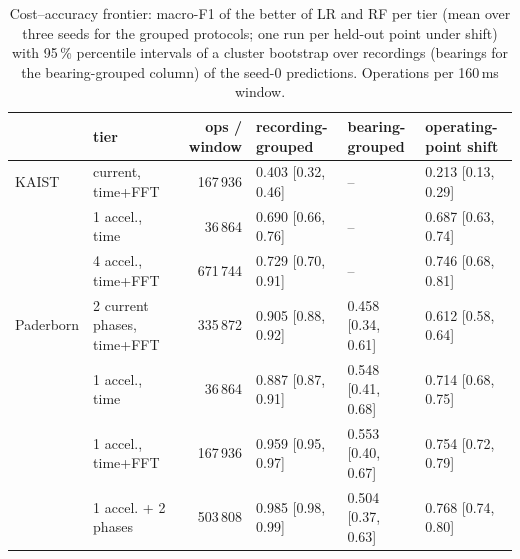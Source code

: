 \begin{table}[tb]\centering\footnotesize
\caption{Cost--accuracy frontier: macro-F1 of the better of LR and RF per tier (mean over three seeds for the grouped protocols; one run per held-out point under shift) with 95\,\% percentile intervals of a cluster bootstrap over recordings (bearings for the bearing-grouped column) of the seed-0 predictions. Operations per 160\,ms window.}
\label{tab:frontier}
\setlength{\tabcolsep}{3.5pt}\begin{tabular}{llrlll}\hline
 & tier & ops / window & recording-grouped & bearing-grouped & operating-point shift \\ \hline
KAIST & current, time+FFT & 167\,936 & 0.403 [0.32, 0.46] & -- & 0.213 [0.13, 0.29] \\
 & 1 accel., time & 36\,864 & 0.690 [0.66, 0.76] & -- & 0.687 [0.63, 0.74] \\
 & 4 accel., time+FFT & 671\,744 & 0.729 [0.70, 0.91] & -- & 0.746 [0.68, 0.81] \\
Paderborn & 2 current phases, time+FFT & 335\,872 & 0.905 [0.88, 0.92] & 0.458 [0.34, 0.61] & 0.612 [0.58, 0.64] \\
 & 1 accel., time & 36\,864 & 0.887 [0.87, 0.91] & 0.548 [0.41, 0.68] & 0.714 [0.68, 0.75] \\
 & 1 accel., time+FFT & 167\,936 & 0.959 [0.95, 0.97] & 0.553 [0.40, 0.67] & 0.754 [0.72, 0.79] \\
 & 1 accel. + 2 phases & 503\,808 & 0.985 [0.98, 0.99] & 0.504 [0.37, 0.63] & 0.768 [0.74, 0.80] \\
\hline\end{tabular}\end{table}